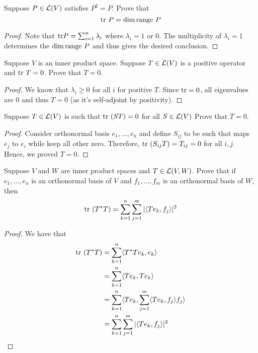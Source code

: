\documentclass{extarticle}
\begin{document}
\begin{problem}{2}
    Suppose \(P \in \mathcal{L}(V)\) satisfies \(P^2 = P\). Prove that 
    \[\text{tr} \ P = \dim \text{range } P\]
\end{problem}

\begin{proof}
Note that \(\text{tr} P = \sum_{i=1}^{n} \lambda_i\) where \(\lambda_i = 1 \) or \(0\). The multiplicity of 
\(\lambda_i = 1\) determines the \(\dim \text{range } P\) and thus gives the desired conclusion.  
\end{proof}

\begin{problem}{5}
    Suppose \(V\) is an inner product space. Suppose \(T \in \mathcal{L}(V)\) is a positive operator and 
    \(\text{tr} \ T = 0\). Prove that \(T = 0\).
\end{problem}

\begin{proof}
We know that \(\lambda_i \geq 0\) for all \(i\) for positive \(T\). Since \(\text{tr} = 0\), all eigenvalues 
are 0 and thus \(T = 0\) (as it's self-adjoint by positivity).
\end{proof}

\begin{problem}{9}
    Suppose \(T \in \mathcal{L}(V)\) is such that \(\text{tr} \ (ST) = 0\) for all \(S \in \mathcal{L}(V)\) Prove that \(T = 0\).
\end{problem}

\begin{proof}
Consider orthonormal basis \(e_1, \ldots, e_n\) and define \(S_{ij}\) to be such that 
maps \(e_j\) to \(e_i\) while keep all other zero. Therefore, \(\tr \ (S_{ij}T) = T_{ij} = 0\) 
for all \(i, j\). Hence, we proved \(T = 0\).
\end{proof}

\begin{problem}{11}
    Suppose \(V\) and \(W\) are inner product spaces and \(T \in \mathcal{L}(V, W)\). Prove that if \(e_1, \ldots, e_n\)
    is an orthonormal basis of \(V\) and \(f_1, \ldots, f_m\) is an orthonormal basis of \(W\), then 
    \[\text{tr} \ (T^* T) = \sum_{k=1}^{n} \sum_{j=1}^m |\langle T e_k,f_j \rangle|^2\]
\end{problem}

\begin{proof}
We have that 
\begin{align*}
    \text{tr} \ (T^* T) 
    &= \sum_{k=1}^{n} \langle T^* T e_k,e_k \rangle \\ 
    &= \sum_{k=1}^{n} \langle T e_k, T e_k \rangle \\ 
    &= \sum_{k=1}^{n} \langle T e_k, \sum_{j=1}^{m} \langle Te_k,f_j \rangle f_j \rangle \\ 
    &= \sum_{k=1}^{n} \sum_{j=1}^{m} |\langle T e_k,f_j \rangle|^2
\end{align*}
\end{proof}
\end{document}
